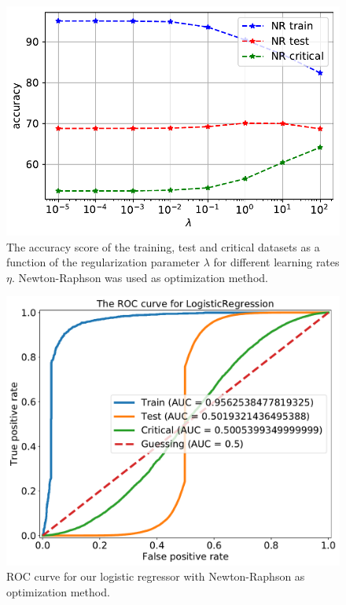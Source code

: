 \begin{figure}[H]
\begin{center}\includegraphics[scale=0.7]{latex/figures/log_acc_nr.pdf}
\end{center}
\caption{The accuracy score of the training, test and critical datasets as a function of the regularization parameter $\lambda$ for different learning rates $\eta$. Newton-Raphson was used as optimization method.}
\label{fig:acc_nr}
\end{figure}

\begin{figure}[H]
\begin{center}\includegraphics[scale=0.5]{latex/figures/logistic_roc_curve_nr.pdf}
\end{center}
\caption{ROC curve for our logistic regressor with Newton-Raphson as optimization method.}
\label{fig:roc_nr}
\end{figure}


